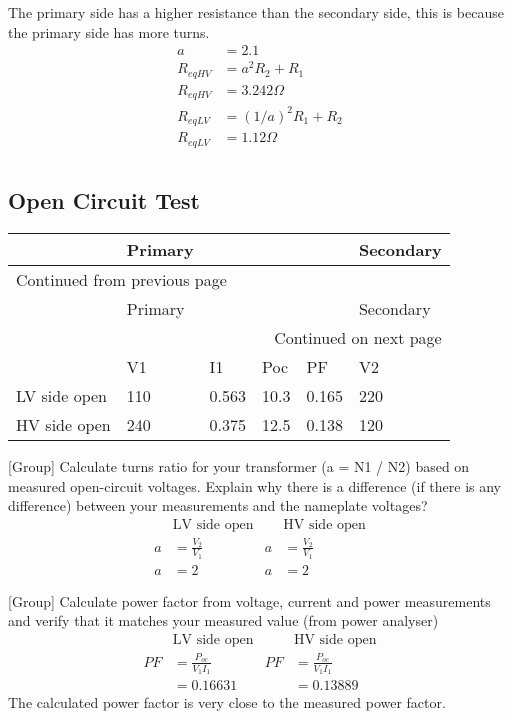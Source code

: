 \documentclass[11pt]{article}
\begin{document}
The primary side has a higher resistance than the secondary side, this is because the primary side has more turns.
\begin{align*}
a&=2.1 \\
R_{eqHV}&=a^{2}R_2+R_1\\
R_{eqHV}&=3.242\Omega \\
R_{eqLV}&=(1/a)^{2}R_1+R_2\\
R_{eqLV}&=1.12\Omega \\
\end{align*}
\subsection{Open Circuit Test}
\label{sec:orgd55cbf3}
\begin{longtable}{|l|l|l|l|l|l|}
\hline
 & Primary &  &  &  & Secondary\\
\hline
\endfirsthead
\multicolumn{6}{l}{Continued from previous page} \\
\hline

 & Primary &  &  &  & Secondary \\

\hline
\endhead
\hline\multicolumn{6}{r}{Continued on next page} \\
\endfoot
\endlastfoot
\hline
 & V1 & I1 & Poc & PF & V2\\
\hline
LV side open & 110 & 0.563 & 10.3 & 0.165 & 220\\
\hline
HV side open & 240 & 0.375 & 12.5 & 0.138 & 120\\
\hline
\end{longtable}

{[}Group] Calculate turns ratio for your transformer (a = N1 / N2) based on measured open-circuit voltages. Explain why there is a difference (if there is any difference) between your measurements and the nameplate voltages?
\begin{align*}
&\textrm{LV side open} & &\textrm{HV side open} \\
a&=\frac{V_{2}}{V_{1}} & a&=\frac{V_{2}}{V_{1}} \\
a&=2 & a&=2
\end{align*}

{[}Group] Calculate power factor from voltage, current and power measurements and verify that it matches your measured value (from power analyser)
\begin{align*}
&\textrm{LV side open} & &\textrm{HV side open} \\
PF&=\frac{P_{oc}}{V_1I_1} & PF&=\frac{P_{oc}}{V_1I_1} \\
&=0.16631 & &= 0.13889
\end{align*}
The calculated power factor is very close to the measured power factor.
\end{document}

